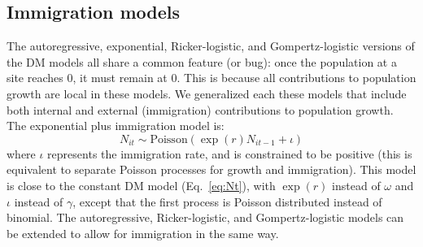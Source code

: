 \documentclass[12pt]{article}
\begin{document}
\subsection{Immigration models}

The autoregressive, exponential, Ricker-logistic, and Gompertz-logistic
versions of the DM models all share a common feature (or bug):
once the population at a site reaches 0, it must remain at 0.
This is because all contributions to population growth are
local in these models.  We generalized each these models that
include both internal and external (immigration) contributions
to population growth.  The exponential plus immigration
model is:
\begin{equation}
  N_{it} \sim \text{Poisson}(\exp(r)N_{it-1} + \iota)
  \label{eq:expimm2}
\end{equation}
where $\iota$ represents the immigration rate, and is
constrained to be
positive (this is equivalent to separate Poisson processes for
growth and immigration).  This model is close to
the constant DM model (Eq.~\ref{eq:Nt}), with $\exp(r)$ instead
of $\omega$ and $\iota$ instead of $\gamma$, except that the first
process is Poisson distributed instead of binomial. The autoregressive, Ricker-logistic,
and Gompertz-logistic models can be extended to allow for immigration in the
same way.

\end{document}
